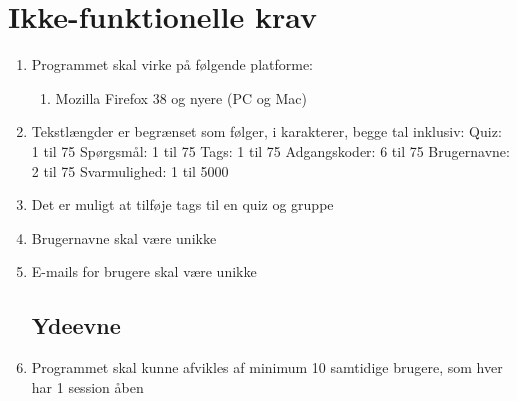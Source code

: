\section{Ikke-funktionelle krav}
\label{sec:nonFunctional}

\begin{enumerate}
	\subsection*{Brugbarhed}
	\item Programmet skal virke på følgende platforme:
	\begin{enumerate}
		\item Mozilla Firefox 38 og nyere (PC og Mac)
	\end{enumerate}

	\item Tekstlængder er begrænset som følger, i karakterer, begge tal inklusiv:
	\subitem Quiz: 1 til 75
	\subitem Spørgsmål: 1 til 75
	\subitem Tags: 1 til 75 
	\subitem Adgangskoder: 6 til 75
	\subitem Brugernavne: 2 til 75
	\subitem Svarmulighed: 1 til 5000
	\item Det er muligt at tilføje tags til en quiz og gruppe
	\item Brugernavne skal være unikke
	\item E-mails for brugere skal være unikke
	
	\subsection*{Ydeevne}
	\item Programmet skal kunne afvikles af minimum 10 samtidige brugere, som hver har 1 session åben
\end{enumerate}